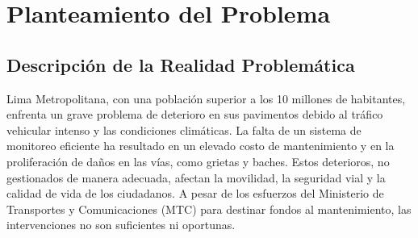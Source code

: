 	\chapter{Planteamiento del Problema}
	\section{Descripción de la Realidad Problemática}

	Lima Metropolitana, con una población superior a los 10 millones de habitantes, enfrenta un grave problema de deterioro en sus pavimentos debido al tráfico vehicular intenso y las condiciones climáticas. La falta de un sistema de monitoreo eficiente ha resultado en un elevado costo de mantenimiento y en la proliferación de daños en las vías, como grietas y baches. Estos deterioros, no gestionados de manera adecuada, afectan la movilidad, la seguridad vial y la calidad de vida de los ciudadanos. A pesar de los esfuerzos del Ministerio de Transportes y Comunicaciones (MTC) para destinar fondos al mantenimiento, las intervenciones no son suficientes ni oportunas.  \parencite{ws_oms2022cancert}

